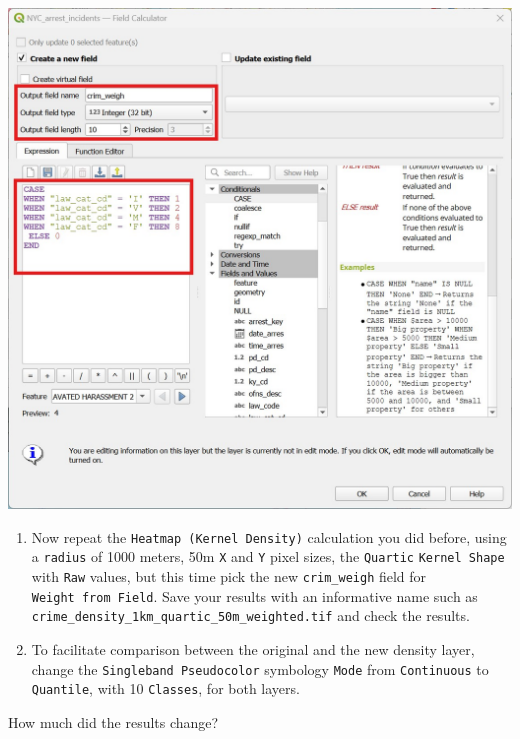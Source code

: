 \documentclass[
  letterpaper,
  DIV=11,
  numbers=noendperiod]{scrreprt}
\begin{document}
\includegraphics{images/lab_13/lab13_fig_case.jpg}

\begin{enumerate}
\def\labelenumi{(\arabic{enumi})}
\setcounter{enumi}{340}
\item
  Now repeat the \texttt{Heatmap\ (Kernel\ Density)} calculation you did
  before, using a \texttt{radius} of 1000 meters, 50m \texttt{X} and
  \texttt{Y} pixel sizes, the \texttt{Quartic} \texttt{Kernel\ Shape}
  with \texttt{Raw} values, but this time pick the new
  \texttt{crim\_weigh} field for \texttt{Weight\ from\ Field}. Save your
  results with an informative name such as
  \texttt{crime\_density\_1km\_quartic\_50m\_weighted.tif} and check the
  results.
\item
  To facilitate comparison between the original and the new density
  layer, change the \texttt{Singleband\ Pseudocolor} symbology
  \texttt{Mode} from \texttt{Continuous} to \texttt{Quantile}, with 10
  \texttt{Classes}, for both layers.
\end{enumerate}

\begin{tcolorbox}[enhanced jigsaw, coltitle=black, toprule=.15mm, breakable, opacitybacktitle=0.6, left=2mm, colback=white, leftrule=.75mm, rightrule=.15mm, colbacktitle=quarto-callout-important-color!10!white, toptitle=1mm, titlerule=0mm, colframe=quarto-callout-important-color-frame, arc=.35mm, bottomtitle=1mm, opacityback=0, bottomrule=.15mm, title=\textcolor{quarto-callout-important-color}{\faExclamation}\hspace{0.5em}{Stop and Think}]

How much did the results change?

\end{tcolorbox}
\end{document}
